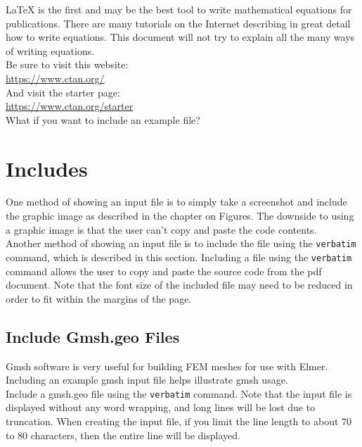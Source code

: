 LaTeX is the first and may be the best tool to write mathematical equations for publications.  There are many tutorials on the Internet describing in great detail how to write equations.  This document will not try to explain all the many ways of writing equations.\\

Be sure to visit this website:\\

\url{https://www.ctan.org/}\\

And visit the starter page:\\

\url{https://www.ctan.org/starter}\\

What if you want to include an example file?

\chapter{Includes}

One method of showing an input file is to simply take a screenshot and include the graphic image as described in the chapter on Figures.  The downside to using a graphic image is that the user can't copy and paste the code contents.\\

Another method of showing an input file is to include the file using the \texttt{verbatim} command, which is described in this section.  Including a file using the \texttt{verbatim} command allows the user to copy and paste the source code from the pdf document.  Note that the font size of the included file may need to be reduced in order to fit within the margins of the page.\\

\section{Include Gmsh.geo Files}

Gmsh software is very useful for building FEM meshes for use with Elmer.  Including an example gmsh input file helps illustrate  gmsh usage.\\

Include a gmsh.geo file using the \texttt{verbatim} command.  Note that the input file is displayed without any word wrapping, and long lines will be lost due to truncation.  When creating the input file, if you limit the line length to about 70 to 80 characters, then the entire line will be displayed.

